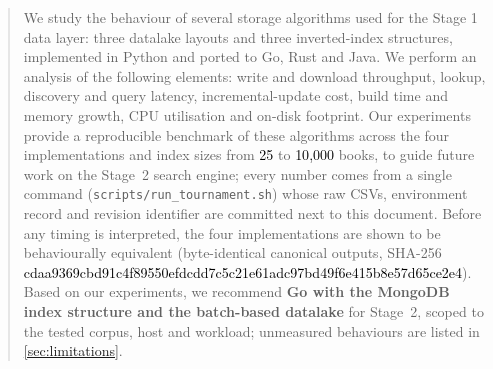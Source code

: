 \documentclass[10pt,a4paper]{article}
\newcommand{\fixed}[1]{\textcolor{black}{#1}}
\begin{document}
{\hypersetup{linkcolor=black}%
\tableofcontents}
\clearpage

\begin{abstract}
We study the behaviour of several storage algorithms used for the Stage 1
data layer: three datalake layouts and three inverted-index structures,
implemented in Python and ported to Go, Rust and Java. We perform an
analysis of the following elements: write and download throughput, lookup,
discovery and query latency, incremental-update cost, build time and memory
growth, CPU utilisation and on-disk footprint. Our experiments provide a
reproducible benchmark of these algorithms across the four implementations
and index sizes from \fixed{25} to \fixed{10{,}000} books, to guide future
work on the Stage~2 search engine; every number comes from a single command
(\texttt{scripts/run\_tournament.sh}) whose raw CSVs, environment record and
revision identifier are committed next to this document. Before any timing
is interpreted, the four implementations are shown to be behaviourally
equivalent (byte-identical canonical outputs, SHA-256
\fixed{cdaa9369cbd91c4f89550efdcdd7c5c21e61adc97bd49f6e415b8e57d65ce2e4}).
Based on our experiments, we recommend \textbf{Go with the MongoDB index
structure and the batch-based datalake} for Stage~2, scoped to the tested
corpus, host and workload; unmeasured behaviours are listed in
\cref{sec:limitations}.
\end{abstract}














\end{document}
